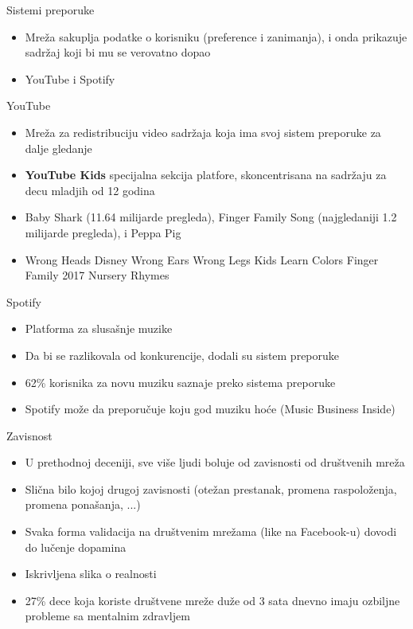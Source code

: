 \documentclass[14pt, aspectratio=169]{beamer}
\begin{document}
\begin{frame}{Sistemi preporuke}
    \begin{itemize}
        \item Mreža sakuplja podatke o korisniku (preference i zanimanja), i onda prikazuje sadržaj koji bi mu se verovatno dopao
    \end{itemize}
    \begin{itemize}
        \item YouTube i Spotify
    \end{itemize}
\end{frame}

\begin{frame}{YouTube}
    \begin{itemize}
        \item Mreža za redistribuciju video sadržaja koja ima svoj sistem preporuke za dalje gledanje
    \end{itemize}
    \begin{itemize}
        \item \textbf{YouTube Kids} specijalna sekcija platfore, skoncentrisana na sadržaju za decu mladjih od 12 godina
        \item Baby Shark (11.64 milijarde pregleda), Finger Family Song (najgledaniji 1.2 milijarde pregleda), i Peppa Pig
        \item Wrong Heads Disney Wrong
        Ears Wrong Legs Kids Learn Colors Finger Family 2017 Nursery Rhymes
    \end{itemize}
\end{frame}

\begin{frame}{Spotify}
    \begin{itemize}
        \item Platforma za slusašnje muzike
        \item Da bi se razlikovala od konkurencije, dodali su sistem preporuke
        \item 62\% korisnika za novu muziku saznaje preko sistema preporuke
        \item Spotify može da preporučuje koju god muziku hoće (Music Business Inside)
    \end{itemize}
\end{frame}


\begin{frame}{Zavisnost}
    \begin{itemize}
        \item U prethodnoj deceniji, sve više ljudi boluje od zavisnosti od društvenih mreža
        \item Slična bilo kojoj drugoj zavisnosti (otežan prestanak, promena raspoloženja, promena ponašanja, ...)
        \item Svaka forma validacija na društvenim mrežama (like na Facebook-u) dovodi do lučenje dopamina
        \item Iskrivljena slika o realnosti
        \item 27\% dece koja koriste društvene mreže duže od 3 sata dnevno imaju ozbiljne probleme sa mentalnim zdravljem
    \end{itemize}
\end{frame}
\end{document}
